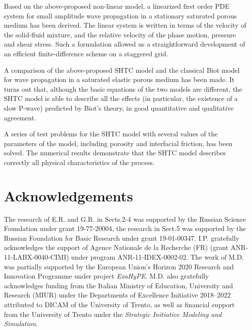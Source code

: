 \documentclass[3p,times,table]{article}
\begin{document}
Based on the above-proposed non-linear model, a linearized first order PDE system 
for small amplitude wave propagation in a stationary saturated porous medium 
has been derived. The linear system is written in terms of the velocity of the 
solid-fluid mixture, and the relative velocity of the phase motion, pressure and shear 
stress. Such a formulation allowed us a straightforward development of an 
efficient finite-difference scheme on a staggered grid.  

A comparison of the above-proposed SHTC model and the classical Biot model for wave 
propagation in a saturated elastic porous  medium has been made.
It turns out that, although the basic equations of the two models are different, 
the SHTC model is able to describe all the effects (in particular, the 
existence of a slow P-wave) predicted by Biot's theory, in good quantitative 
and qualitative agreement.

A series of test problems for the SHTC model with several values of 
the parameters of the model, including porosity and interfacial friction, has been 
solved. The numerical results demonstrate that the SHTC model describes 
correctly all physical characteristics of the process.   

\section*{Acknowledgements}
% 
The research of E.R. and G.R. in Sects.2-4 was supported by the Russian Science Foundation  under grant 19-77-20004, the research in Sect.5 was supported by the Russian Foundation for Basic Research under grant 19-01-00347.
I.P. gratefully acknowledges the support of Agence Nationale de la Recherche (FR) 
(grant ANR-11-LABX-0040-CIMI) under program ANR-11-IDEX-0002-02.
The work of M.D. was partially supported by the European Union's Horizon 2020 Research and Innovation  Programme under project \textit{ExaHyPE}. 
M.D. also gratefully acknowledges funding from the Italian Ministry of Education, University and Research (MIUR) under the Departments of Excellence Initiative 2018--2022 attributed to DICAM of the University of Trento, as well as financial support from the University of Trento under the  \textit{Strategic Initiative Modeling and Simulation}.



\printbibliography
\end{document}
